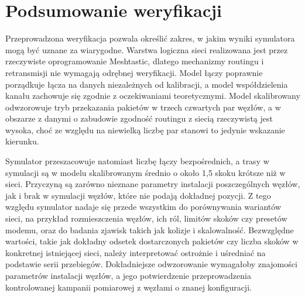 \section{Podsumowanie weryfikacji}

Przeprowadzona weryfikacja pozwala określić zakres, w jakim wyniki symulatora mogą być uznane za wiarygodne. Warstwa logiczna sieci realizowana jest przez rzeczywiste oprogramowanie Meshtastic, dlatego mechanizmy routingu i retransmisji nie wymagają odrębnej weryfikacji. Model łączy poprawnie porządkuje łącza na danych niezależnych od kalibracji, a model współdzielenia kanału zachowuje się zgodnie z oczekiwaniami teoretycznymi. Model skalibrowany odwzorowuje tryb przekazania pakietów w trzech czwartych par węzłów, a w obszarze z danymi o zabudowie zgodność routingu z siecią rzeczywistą jest wysoka, choć ze względu na niewielką liczbę par stanowi to jedynie wskazanie kierunku.

Symulator przeszacowuje natomiast liczbę łączy bezpośrednich, a trasy w symulacji są w modelu skalibrowanym średnio o około 1,5 skoku krótsze niż w sieci. Przyczyną są zarówno nieznane parametry instalacji poszczególnych węzłów, jak i brak w symulacji węzłów, które nie podają dokładnej pozycji. Z tego względu symulator nadaje się przede wszystkim do porównywania wariantów sieci, na przykład rozmieszczenia węzłów, ich ról, limitów skoków czy presetów modemu, oraz do badania zjawisk takich jak kolizje i skalowalność. Bezwzględne wartości, takie jak dokładny odsetek dostarczonych pakietów czy liczba skoków w konkretnej istniejącej sieci, należy interpretować ostrożnie i uśredniać na podstawie serii przebiegów. Dokładniejsze odwzorowanie wymagałoby znajomości parametrów instalacji węzłów, a jego potwierdzenie przeprowadzenia kontrolowanej kampanii pomiarowej z węzłami o znanej konfiguracji.
